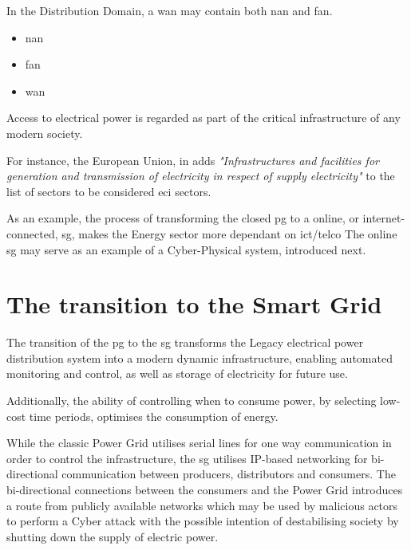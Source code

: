 In the Distribution Domain, a \acrfull{wan} may contain both \acrfull{nan} and \acrfull{fan}. 
\begin{itemize}

\item \acrfull{nan} %
\item \acrfull{fan} %
\item \acrfull{wan}  %
\end{itemize}









Access to electrical power is regarded as part of the critical infrastructure of any modern society. 

 For instance, the European Union, in \cite[p.  L 345/81]{eu2008council} adds \textit{"Infrastructures and facilities for generation and transmission of
electricity in respect of supply electricity"} to the list of sectors to be considered \acrfull{eci} sectors.







As an example, the process of transforming the closed \acrshort{pg} to a online, or internet-connected, \acrshort{sg}, makes the Energy sector more dependant on \acrshort{ict}/\acrshort{telco}
The online \acrshort{sg} may serve as an example of a Cyber-Physical system, introduced next. 






\section{The transition to the Smart Grid} 
The transition of the \acrlong{pg} to the \acrlong{sg} transforms the Legacy electrical power distribution system into a modern dynamic infrastructure, enabling automated monitoring and control, as well as storage of electricity for future use. 


Additionally, the ability of controlling when to consume power, by selecting low-cost time periods, optimises the consumption of energy. 







While the classic Power Grid utilises serial lines for one way communication in order to control the infrastructure, the \acrlong{sg} utilises IP-based networking for bi-directional communication between producers, distributors and consumers. The bi-directional connections between the consumers and the Power Grid introduces a route from publicly available networks which may be used by malicious actors to perform a Cyber attack with the possible intention of destabilising society by shutting down the supply of electric power.\\ 




